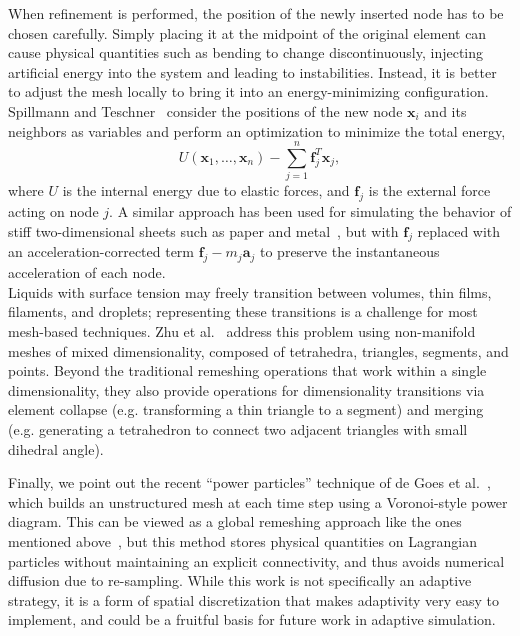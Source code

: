 When refinement is performed, the position of the newly inserted node has to be chosen carefully.
Simply placing it at the midpoint of the original element can cause physical quantities such as bending to change discontinuously, injecting artificial energy into the system and leading to instabilities.
Instead, it is better to adjust the mesh locally to bring it into an energy-minimizing configuration.
Spillmann and Teschner~\cite{Spillmann2008} consider the positions of the new node $\mathbf x_i$ and its neighbors as variables and perform an optimization to minimize the total energy,
\begin{equation}
	U(\mathbf x_1,\ldots,\mathbf x_n) - \sum_{j=1}^n\mathbf f_j^T\mathbf x_j,
\end{equation}
where $U$ is the internal energy due to elastic forces, and $\mathbf f_j$ is the external force acting on node $j$.
A similar approach has been used for simulating the behavior of stiff two-dimensional sheets such as paper and metal~\cite{Narain2013,Pfaff2014}, but with $\mathbf f_j$ replaced with an acceleration-corrected term $\mathbf f_j - m_j\mathbf a_j$ to preserve the instantaneous acceleration of each node.
\\
Liquids with surface tension may freely transition between volumes, thin films, filaments, and droplets; representing these transitions is a challenge for most mesh-based techniques.
Zhu et al.~\cite{Zhu2014} address this problem using non-manifold meshes of mixed dimensionality, composed of tetrahedra, triangles, segments, and points.
Beyond the traditional remeshing operations that work within a single dimensionality, they also provide operations for dimensionality transitions via element collapse (e.g. transforming a thin triangle to a segment) and merging (e.g. generating a tetrahedron to connect two adjacent triangles with small dihedral angle).

Finally, we point out the recent ``power particles'' technique of de Goes et al.~\cite{deGoes2015}, which builds an unstructured mesh at each time step using a Voronoi-style power diagram.
This can be viewed as a global remeshing approach like the ones mentioned above~\cite{Klingner2006,Bargteil2007}, but this method stores physical quantities on Lagrangian particles without maintaining an explicit connectivity, and thus avoids numerical diffusion due to re-sampling.
While this work is not specifically an adaptive strategy, it is a form of spatial discretization that makes adaptivity very easy to implement, and could be a fruitful basis for future work in adaptive simulation.

